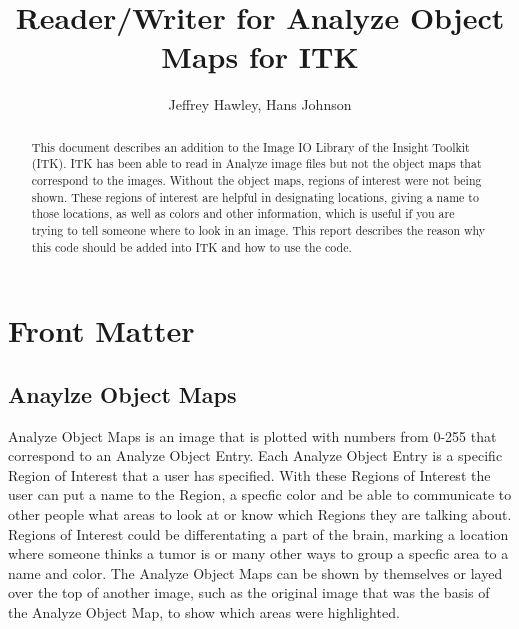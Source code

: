 \documentclass{InsightArticle}
\title{Reader/Writer for Analyze Object Maps for ITK}
\author{Jeffrey Hawley, Hans Johnson }
\begin{document}
\ifpdf
\else
\fi


\maketitle


\ifhtml
\chapter*{Front Matter\label{front}}
\fi


\begin{abstract}
\noindent
This document describes an addition to the Image IO Library of the Insight Toolkit (ITK).
ITK has been able to read in Analyze image files but not the object maps that correspond
to the images.  Without the object maps, regions of interest were not being shown.
These regions of interest are helpful in designating locations, giving a name to those
locations, as well as colors and other information, which is useful if you are trying to tell
someone where to look in an image.  This report describes the reason why this code should be
added into ITK and how to use the code.
\end{abstract}

\tableofcontents

\section{Anaylze Object Maps}
Analyze Object Maps is an image that is plotted with numbers from 0-255 that correspond to an Analyze Object Entry.  Each Analyze Object Entry
is a specific Region of Interest that a user has specified. With these Regions of Interest the user can put a name to the Region, a specfic color and be able to communicate to other people what areas to look at or know which Regions they are talking about.  Regions of Interest could be differentating a part of the brain, marking a location where someone thinks a tumor is or many other ways to group a specfic area to a name and color.  The Analyze Object Maps can be shown by themselves or layed over the top of another image, such as the original image that was the basis of the Analyze Object Map, to show which areas were highlighted.
  
\end{document}
